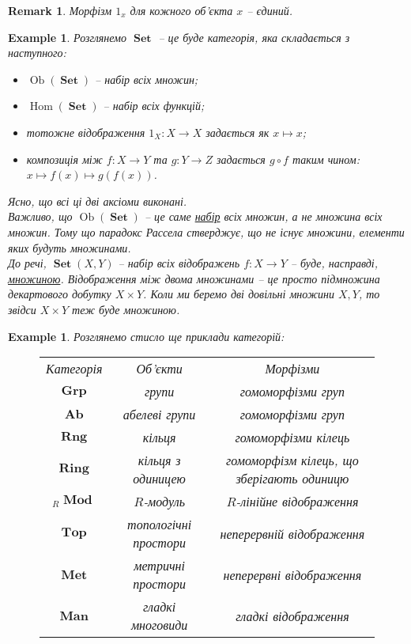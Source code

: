\documentclass[a4paper, 10pt]{article}
\theoremstyle{theoremdd}
\newtheorem{example}[theorem]{Example}
\newtheorem{remark}[theorem]{Remark}
\DeclareMathOperator{\Ob}{Ob}
\DeclareMathOperator{\Hom}{Hom}
\DeclareMathOperator{\Set}{\textbf{Set}}
\DeclareMathOperator{\Grp}{\textbf{Grp}}
\DeclareMathOperator{\Ab}{\textbf{Ab}}
\DeclareMathOperator{\Ring}{\textbf{Ring}}
\DeclareMathOperator{\Rng}{\textbf{Rng}}
\DeclareMathOperator{\Top}{\textbf{Top}}
\DeclareMathOperator{\Mod}{\textbf{Mod}}
\DeclareMathOperator{\Met}{\textbf{Met}}
\DeclareMathOperator{\Mani}{\textbf{Man}}
\begin{document}
\begin{remark}
Морфізм $1_x$ для кожного об'єкта $x$ -- єдиний.
\end{remark}

\begin{example}
Розглянемо $\Set$ -- це буде категорія, яка складається з наступного:
\begin{itemize}[nosep, wide=0pt, label={--}]
\item $\Ob(\Set)$ -- набір всіх множин;
\item $\Hom(\Set)$ -- набір всіх функцій;
\item тотожне відображення $1_X \colon X \to X$ задається як $x \mapsto x$;
\item композиція між $f \colon X \to Y$ та $g \colon Y \to Z$ задається $g \circ f$ таким чином: $x \mapsto f(x) \mapsto g(f(x))$.
\end{itemize}
Ясно, що всі ці дві аксіоми виконані.
\bigskip \\
Важливо, що $\Ob(\Set)$ -- це саме \underline{набір} всіх множин, а не множина всіх множин. Тому що парадокс Рассела стверджує, що не існує множини, елементи яких будуть множинами.\\
До речі, $\Set(X,Y)$ -- набір всіх відображень $f \colon X \to Y$ -- буде, насправді, \underline{множиною}. Відображення між двома множинами -- це просто підмножина декартового добутку $X \times Y$. Коли ми беремо дві довільні множини $X,Y$, то звідси $X \times Y$ теж буде множиною.
\end{example}

\begin{example}
Розглянемо стисло ще приклади категорій:
\begin{figure}[H]
\centering
\begin{tabular}{c|c|c}
Категорія & Об'єкти & Морфізми \\
$\Grp$ & групи & гомоморфізми груп \\
$\Ab$ & абелеві групи & гомоморфізми груп \\
$\Rng$ & кільця & гомоморфізми кілець \\
$\Ring$ & кільця з одиницею & гомоморфізм кілець, що зберігають одиницю \\
${}_{R}\Mod$ & $R$-модуль & $R$-лінійне відображення \\
$\Top$ & топологічні простори & неперервній відображення \\
$\Met$ & метричні простори & неперервні відображення \\
$\Mani$ & гладкі многовиди & гладкі відображення
\end{tabular}
\end{figure}
\end{example}
\end{document}
